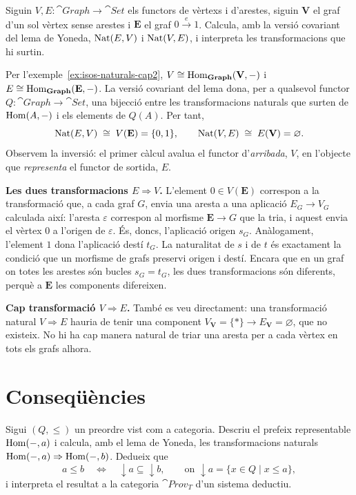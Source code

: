 \begin{exercici}\label{pr-yoneda-grafs}
Siguin $V,E\colon\cat{Graph}\to\cat{Set}$ els functors de vèrtexs i d'arestes, siguin $\mathbf V$ el graf d'un sol vèrtex sense arestes i $\mathbf E$ el graf $0\xrightarrow{e}1$. Calcula, amb la versió covariant del lema de Yoneda, $\operatorname{Nat}(E,V)$ i $\operatorname{Nat}(V,E)$, i interpreta les transformacions que hi surtin.
\end{exercici}

\begin{solucio}
Per l'exemple~\ref{ex:isos-naturals-cap2}, $V\cong\operatorname{Hom}_{\mathbf{Graph}}(\mathbf V,-)$ i $E\cong\operatorname{Hom}_{\mathbf{Graph}}(\mathbf E,-)$. La versió covariant del lema dona, per a qualsevol functor $Q\colon\cat{Graph}\to\cat{Set}$, una bijecció entre les transformacions naturals que surten de $\operatorname{Hom}(A,-)$ i els elements de $Q(A)$. Per tant,
\[
\operatorname{Nat}(E,V)\;\cong\;V(\mathbf E)=\{0,1\},
\qquad
\operatorname{Nat}(V,E)\;\cong\;E(\mathbf V)=\varnothing.
\]
Observem la inversió: el primer càlcul avalua el functor d'\emph{arribada}, $V$, en l'objecte que \emph{representa} el functor de sortida, $E$.

\textbf{Les dues transformacions $E\Rightarrow V$.} L'element $0\in V(\mathbf E)$ correspon a la transformació que, a cada graf $G$, envia una aresta a una aplicació $E_G\to V_G$ calculada així: l'aresta $\varepsilon$ correspon al morfisme $\mathbf E\to G$ que la tria, i aquest envia el vèrtex $0$ a l'origen de $\varepsilon$. És, doncs, l'aplicació origen $s_G$. Anàlogament, l'element $1$ dona l'aplicació destí $t_G$. La naturalitat de $s$ i de $t$ és exactament la condició que un morfisme de grafs preservi origen i destí. Encara que en un graf on totes les arestes són bucles $s_G=t_G$, les dues transformacions són diferents, perquè a $\mathbf E$ les components difereixen.

\textbf{Cap transformació $V\Rightarrow E$.} També es veu directament: una transformació natural $V\Rightarrow E$ hauria de tenir una component $V_{\mathbf V}=\{\ast\}\to E_{\mathbf V}=\varnothing$, que no existeix. No hi ha cap manera natural de triar una aresta per a cada vèrtex en tots els grafs alhora.
\end{solucio}

\section{Conseqüències}

\begin{exercici}\label{pr-yoneda-preordre}
Sigui $(Q,\le)$ un preordre vist com a categoria. Descriu el prefeix representable $\operatorname{Hom}(-,a)$ i calcula, amb el lema de Yoneda, les transformacions naturals $\operatorname{Hom}(-,a)\Rightarrow\operatorname{Hom}(-,b)$. Dedueix que
\[
a\le b\quad\Longleftrightarrow\quad{\downarrow}a\subseteq{\downarrow}b,
\qquad\text{on } {\downarrow}a=\{x\in Q\mid x\le a\},
\]
i interpreta el resultat a la categoria $\cat{Prov}_T$ d'un sistema deductiu.
\end{exercici}

